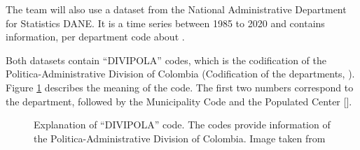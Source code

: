 \documentclass[11pt]{article}
\begin{document}
The team will also use a dataset from the National Administrative Department for Statistics DANE. It is a time series between 1985 to 2020 and contains information, per department code about \cite{DANE} .

Both datasets contain ``DIVIPOLA'' codes, which is the codification of the Politica-Administrative Division of Colombia (Codification of the departments, ). Figure \ref{fig:divipola} describes the meaning of the code. The first two numbers correspond to the department, followed by the Municipality Code and the Populated Center [\cite{divipola}].


\begin{figure}[!ht]
        \caption{Explanation of ``DIVIPOLA'' code. The codes provide information of the Politica-Administrative Division of Colombia. Image taken from \cite{divipola}}
        \label{fig:divipola}
      \end{figure}


%
%
\end{document}
